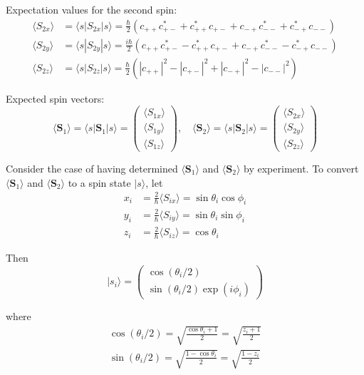 Expectation values for the second spin:
\begin{align*}
\langle S_{2x}\rangle&=\langle s|S_{2x}|s\rangle
=\frac{\hbar}{2}
\left(c_{++}c_{+-}^*+c_{++}^*c_{+-}+c_{-+}c_{--}^*+c_{-+}^*c_{--}\right)
\\
\langle S_{2y}\rangle&=\langle s|S_{2y}|s\rangle
=\frac{i\hbar}{2}
\left(c_{++}c_{+-}^*-c_{++}^*c_{+-}+c_{-+}c_{--}^*-c_{-+}^*c_{--}\right)
\\
\langle S_{2z}\rangle&=\langle s|S_{2z}|s\rangle
=\frac{\hbar}{2}
\left(|c_{++}|^2-|c_{+-}|^2+|c_{-+}|^2-|c_{--}|^2\right)
\end{align*}

Expected spin vectors:
\begin{equation*}
\langle\mathbf S_1\rangle=\langle s|\mathbf S_1|s\rangle
=\begin{pmatrix}
\langle S_{1x}\rangle\\
\langle S_{1y}\rangle\\
\langle S_{1z}\rangle
\end{pmatrix},\quad
\langle\mathbf S_2\rangle=\langle s|\mathbf S_2|s\rangle
=\begin{pmatrix}
\langle S_{2x}\rangle\\
\langle S_{2y}\rangle\\
\langle S_{2z}\rangle
\end{pmatrix}
\end{equation*}

Consider the case of having determined $\langle\mathbf S_1\rangle$ and
$\langle\mathbf S_2\rangle$ by experiment.
To convert $\langle\mathbf S_1\rangle$ and $\langle\mathbf S_2\rangle$
to a spin state $|s\rangle$, let
\begin{align*}
x_i&=\frac{2}{\hbar}\langle S_{ix}\rangle=\sin\theta_i\cos\phi_i
\\
y_i&=\frac{2}{\hbar}\langle S_{iy}\rangle=\sin\theta_i\sin\phi_i
\\
z_i&=\frac{2}{\hbar}\langle S_{iz}\rangle=\cos\theta_i
\end{align*}

Then
\begin{equation*}
|s_i\rangle=\begin{pmatrix}\cos(\theta_i/2)\\\sin(\theta_i/2)\exp(i\phi_i)\end{pmatrix}
\end{equation*}

where
\begin{align*}
\cos(\theta_i/2)=\sqrt{\frac{\cos\theta_i+1}{2}}=\sqrt{\frac{z_i+1}{2}}
\\
\sin(\theta_i/2)=\sqrt{\frac{1-\cos\theta_i}{2}}=\sqrt{\frac{1-z_i}{2}}
\end{align*}

